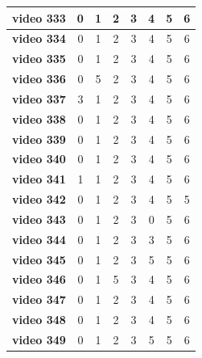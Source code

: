 \begin{table}[]
\begin{tabular}{c|c|c|c|c|c|c|c|}
\multicolumn{1}{|c|}{\textbf{video 333}} & 0 & 1 & 2 & 3 & 4 & 5 & 6 \\ \hline
\multicolumn{1}{|c|}{\textbf{video 334}} & 0 & 1 & 2 & 3 & 4 & 5 & 6 \\ \hline
\multicolumn{1}{|c|}{\textbf{video 335}} & 0 & 1 & 2 & 3 & 4 & 5 & 6 \\ \hline
\multicolumn{1}{|c|}{\textbf{video 336}} & 0 & 5 & 2 & 3 & 4 & 5 & 6 \\ \hline
\multicolumn{1}{|c|}{\textbf{video 337}} & 3 & 1 & 2 & 3 & 4 & 5 & 6 \\ \hline
\multicolumn{1}{|c|}{\textbf{video 338}} & 0 & 1 & 2 & 3 & 4 & 5 & 6 \\ \hline
\multicolumn{1}{|c|}{\textbf{video 339}} & 0 & 1 & 2 & 3 & 4 & 5 & 6 \\ \hline
\multicolumn{1}{|c|}{\textbf{video 340}} & 0 & 1 & 2 & 3 & 4 & 5 & 6 \\ \hline
\multicolumn{1}{|c|}{\textbf{video 341}} & 1 & 1 & 2 & 3 & 4 & 5 & 6 \\ \hline
\multicolumn{1}{|c|}{\textbf{video 342}} & 0 & 1 & 2 & 3 & 4 & 5 & 5 \\ \hline
\multicolumn{1}{|c|}{\textbf{video 343}} & 0 & 1 & 2 & 3 & 0 & 5 & 6 \\ \hline
\multicolumn{1}{|c|}{\textbf{video 344}} & 0 & 1 & 2 & 3 & 3 & 5 & 6 \\ \hline
\multicolumn{1}{|c|}{\textbf{video 345}} & 0 & 1 & 2 & 3 & 5 & 5 & 6 \\ \hline
\multicolumn{1}{|c|}{\textbf{video 346}} & 0 & 1 & 5 & 3 & 4 & 5 & 6 \\ \hline
\multicolumn{1}{|c|}{\textbf{video 347}} & 0 & 1 & 2 & 3 & 4 & 5 & 6 \\ \hline
\multicolumn{1}{|c|}{\textbf{video 348}} & 0 & 1 & 2 & 3 & 4 & 5 & 6 \\ \hline
\multicolumn{1}{|c|}{\textbf{video 349}} & 0 & 1 & 2 & 3 & 5 & 5 & 6 \\ \hline
\end{tabular}
\end{table}

